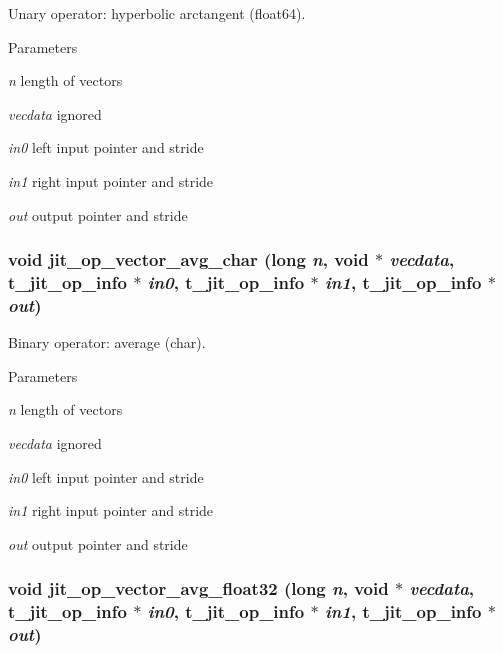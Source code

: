 Unary operator: hyperbolic arctangent (float64). 
\begin{DoxyParams}{Parameters}
\item[{\em n}]length of vectors \item[{\em vecdata}]ignored \item[{\em in0}]left input pointer and stride \item[{\em in1}]right input pointer and stride \item[{\em out}]output pointer and stride \end{DoxyParams}
\hypertarget{group__opvecmod_ga68eefadefa7143d0d6e34fa12e5b5a9c}{
\subsubsection[{jit\_\-op\_\-vector\_\-avg\_\-char}]{\setlength{\rightskip}{0pt plus 5cm}void jit\_\-op\_\-vector\_\-avg\_\-char (long {\em n}, \/  void $\ast$ {\em vecdata}, \/  {\bf t\_\-jit\_\-op\_\-info} $\ast$ {\em in0}, \/  {\bf t\_\-jit\_\-op\_\-info} $\ast$ {\em in1}, \/  {\bf t\_\-jit\_\-op\_\-info} $\ast$ {\em out})}}
\label{group__opvecmod_ga68eefadefa7143d0d6e34fa12e5b5a9c}


Binary operator: average (char). 
\begin{DoxyParams}{Parameters}
\item[{\em n}]length of vectors \item[{\em vecdata}]ignored \item[{\em in0}]left input pointer and stride \item[{\em in1}]right input pointer and stride \item[{\em out}]output pointer and stride \end{DoxyParams}
\hypertarget{group__opvecmod_ga738a6c10eeeae9ab6d01e02d8cb6f1af}{
\subsubsection[{jit\_\-op\_\-vector\_\-avg\_\-float32}]{\setlength{\rightskip}{0pt plus 5cm}void jit\_\-op\_\-vector\_\-avg\_\-float32 (long {\em n}, \/  void $\ast$ {\em vecdata}, \/  {\bf t\_\-jit\_\-op\_\-info} $\ast$ {\em in0}, \/  {\bf t\_\-jit\_\-op\_\-info} $\ast$ {\em in1}, \/  {\bf t\_\-jit\_\-op\_\-info} $\ast$ {\em out})}}
\label{group__opvecmod_ga738a6c10eeeae9ab6d01e02d8cb6f1af}


